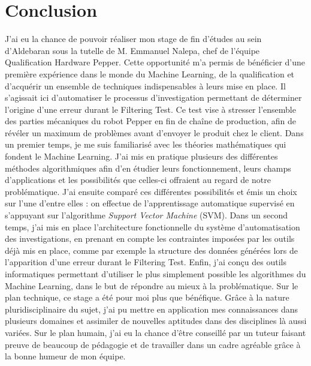 \chapter{Conclusion}
\label{Conclusion}
\thispagestyle{fancy}

J'ai eu la chance de pouvoir réaliser mon stage de fin d'études au sein d'Aldebaran sous la tutelle de M. Emmanuel Nalepa, chef de l'équipe Qualification Hardware Pepper. Cette opportunité m'a permis de bénéficier d'une première expérience dans le monde du Machine Learning, de la qualification et d'acquérir un ensemble de techniques indispensables à leurs mise en place. Il s'agissait ici d'automatiser le processus d'investigation permettant de déterminer l'origine d'une erreur durant le Filtering Test. Ce test vise à stresser l'ensemble des parties mécaniques du robot Pepper en fin de chaîne de production, afin de révéler un maximum de problèmes avant d'envoyer le produit chez le client.
\newline
\newline
Dans un premier temps, je me suis familiarisé avec les théories mathématiques qui fondent le Machine Learning. J'ai mis en pratique plusieurs des différentes méthodes algorithmiques afin d'en étudier leurs fonctionnement, leurs champs d'applications et les possibilités que celles-ci offraient au regard de notre problématique. J'ai ensuite comparé ces différentes possibilités et émis un choix sur l'une d'entre elles : on effectue de l'apprentissage automatique supervisé en s'appuyant sur l'algorithme \emph{Support Vector Machine} (SVM).
\newline
Dans un second temps, j'ai mis en place l'architecture fonctionnelle du système d'automatisation des investigations, en prenant en compte les contraintes imposées par les outils déjà mis en place, comme par exemple la structure des données générées lors de l'apparition d'une erreur durant le Filtering Test. 
\newline
Enfin, j'ai conçu des outils informatiques permettant d'utiliser le plus simplement possible les algorithmes du Machine Learning, dans le but de répondre au mieux à la problématique. 
\newline
\newline
Sur le plan technique, ce stage a été pour moi plus que bénéfique. Grâce à la nature pluridisciplinaire du sujet, j'ai pu mettre en application mes connaissances dans plusieurs domaines et assimiler de nouvelles aptitudes dans des disciplines là aussi variées. Sur le plan humain, j'ai eu la chance d’être conseillé par un tuteur faisant preuve de beaucoup de pédagogie et de travailler dans un cadre agréable grâce à la bonne humeur de mon équipe.